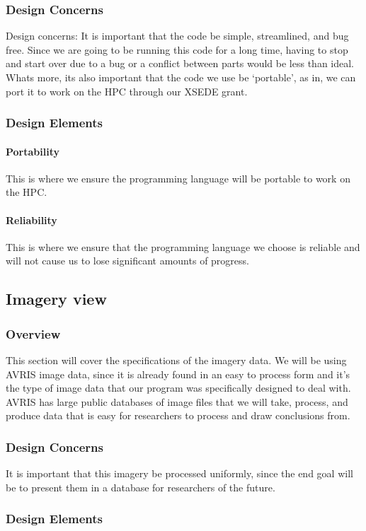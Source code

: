 \documentclass[10pt,draftclsnofoot,onecolumn,journal,compsoc]{IEEEtran}
\begin{document}
\subsubsection{Design Concerns}
Design concerns: It is important that the code be simple, streamlined, and bug free. Since we are going to be running this code for a long time, having to stop and start over due to a bug or a conflict between parts would be less than ideal. Whats more, its also important that the code we use be ‘portable’, as in, we can port it to work on the HPC through our XSEDE grant.
\subsubsection{Design Elements}
\paragraph{Portability}
This is where we ensure the programming language will be portable to work on the HPC.
\paragraph{Reliability}
This is where we ensure that the programming language we choose is reliable and will not cause us to lose significant amounts of progress.

\subsection{Imagery view}
\subsubsection{Overview}
This section will cover the specifications of the imagery data. We will be using AVRIS image data, since it is already found in an easy to process form and it’s the type of image data that our program was specifically designed to deal with. AVRIS has large public databases of image files that we will take, process, and produce data that is easy for researchers to process and draw conclusions from.
\subsubsection{Design Concerns}
It is important that this imagery be processed uniformly, since the end goal will be to present them in a database for researchers of the future.
\subsubsection{Design Elements}
\end{document}
